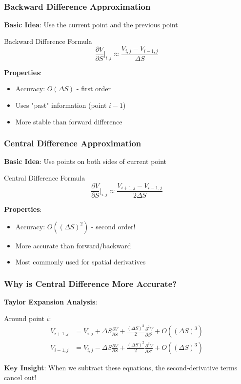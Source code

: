 \documentclass[aspectratio=169]{beamer}
\begin{document}
\begin{frame}
\frametitle{Backward Difference Approximation}
\textbf{Basic Idea}: Use the current point and the previous point

\begin{block}{Backward Difference Formula}
\[\frac{\partial V}{\partial S} \bigg|_{i,j} \approx \frac{V_{i,j} - V_{i-1,j}}{\Delta S}\]
\end{block}

\textbf{Properties}:
\begin{itemize}
\item Accuracy: \(O(\Delta S)\) - first order
\item Uses "past" information (point \(i-1\))
\item More stable than forward difference
\end{itemize}
\end{frame}

\begin{frame}
\frametitle{Central Difference Approximation}
\textbf{Basic Idea}: Use points on both sides of current point

\begin{block}{Central Difference Formula}
\[\frac{\partial V}{\partial S} \bigg|_{i,j} \approx \frac{V_{i+1,j} - V_{i-1,j}}{2\Delta S}\]
\end{block}

\textbf{Properties}:
\begin{itemize}
\item Accuracy: \(O((\Delta S)^2)\) - second order!
\item More accurate than forward/backward
\item Most commonly used for spatial derivatives
\end{itemize}
\end{frame}

\begin{frame}
\frametitle{Why is Central Difference More Accurate?}
\textbf{Taylor Expansion Analysis}:

Around point \(i\):
\begin{align}
V_{i+1,j} &= V_{i,j} + \Delta S \frac{\partial V}{\partial S} + \frac{(\Delta S)^2}{2} \frac{\partial^2 V}{\partial S^2} + O((\Delta S)^3) \\
V_{i-1,j} &= V_{i,j} - \Delta S \frac{\partial V}{\partial S} + \frac{(\Delta S)^2}{2} \frac{\partial^2 V}{\partial S^2} + O((\Delta S)^3)
\end{align}

\textbf{Key Insight}: When we subtract these equations, the second-derivative terms cancel out!
\end{frame}
\end{document}
